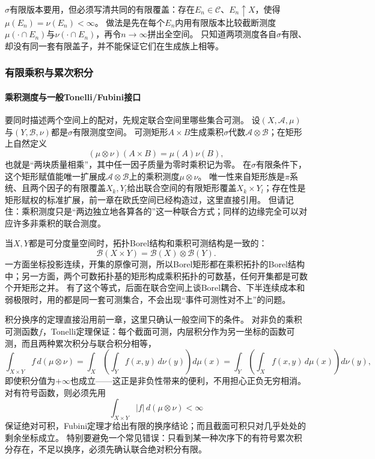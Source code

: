 $\sigma$有限版本要用，但必须写清共同的有限覆盖：存在$E_n\in\mathcal C$、$E_n\uparrow X$，使得$\mu(E_n)=\nu(E_n)<\infty$。
做法是先在每个$E_n$内用有限版本比较截断测度$\mu(\cdot\cap E_n)$与$\nu(\cdot\cap E_n)$，再令$n\to\infty$拼出全空间。
只知道两项测度各自$\sigma$有限、却没有同一套有限盖子，并不能保证它们在生成族上相等。

\subsubsection{有限乘积与累次积分}

\paragraph{乘积测度与一般Tonelli/Fubini接口}

要同时描述两个空间上的配对，先规定联合空间里哪些集合可测。
设$(X,\mathcal A,\mu)$与$(Y,\mathcal B,\nu)$都是$\sigma$有限测度空间。
可测矩形$A\times B$生成乘积$\sigma$代数$\mathcal A\otimes\mathcal B$；在矩形上自然定义
\[
 (\mu\otimes\nu)(A\times B)=\mu(A)\nu(B),
\]
也就是“两块质量相乘”，其中任一因子质量为零时乘积记为零。
在$\sigma$有限条件下，这个矩形赋值能唯一扩展成$\mathcal A\otimes\mathcal B$上的乘积测度$\mu\otimes\nu$。
唯一性来自矩形族是$\pi$系统、且两个因子的有限覆盖$X_k,Y_l$给出联合空间的有限矩形覆盖$X_k\times Y_l$；存在性是矩形赋权的标准扩展，前一章在欧氏空间已经构造过，这里直接引用。
但请记住：乘积测度只是“两边独立地各算各的”这一种联合方式；同样的边缘完全可以对应许多非乘积的联合测度。

当$X,Y$都是可分度量空间时，拓扑Borel结构和乘积可测结构是一致的：
\[
 \mathcal B(X\times Y)=\mathcal B(X)\otimes\mathcal B(Y).
\]
一方面坐标投影连续，开集的原像可测，所以Borel矩形都在乘积拓扑的Borel结构中；另一方面，两个可数拓扑基的矩形构成乘积拓扑的可数基，任何开集都是可数个开矩形之并。
有了这个等式，后面在联合空间上谈Borel耦合、下半连续成本和弱极限时，用的都是同一套可测集合，不会出现“事件可测性对不上”的问题。

积分换序的定理直接沿用前一章，这里只确认一般空间下的条件。
对非负的乘积可测函数$f$，Tonelli定理保证：每个截面可测，内层积分作为另一坐标的函数可测，而且两种累次积分与联合积分相等，
\[
 \int_{X\times Y}f\,d(\mu\otimes\nu)
 =\int_X\!\left(\int_Y f(x,y)\,d\nu(y)\right)d\mu(x)
 =\int_Y\!\left(\int_X f(x,y)\,d\mu(x)\right)d\nu(y),
\]
即使积分值为$+\infty$也成立——这正是非负性带来的便利，不用担心正负无穷相消。
对有符号函数，则必须先用
\[
 \int_{X\times Y}|f|\,d(\mu\otimes\nu)<\infty
\]
保证绝对可积，Fubini定理才给出有限的换序结论；而且截面可积只对几乎处处的剩余坐标成立。
特别要避免一个常见错误：只看到某一种次序下的有符号累次积分存在，不足以换序，必须先确认联合绝对积分有限。

